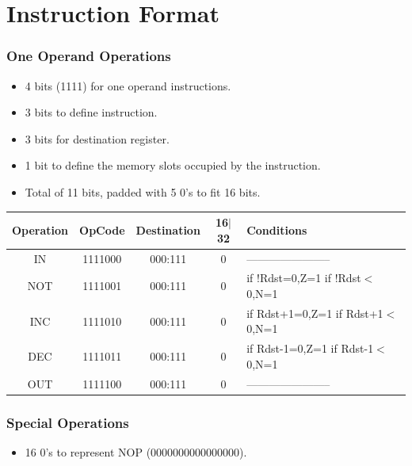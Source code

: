 \documentclass[12pt]{report}
\begin{document}
\part{Instruction Format}

\section{One Operand Operations}
\begin{itemize}
    \item 4 bits (1111) for one operand instructions.
    \item 3 bits to define instruction.
    \item 3 bits for destination register.
    \item 1 bit to define the memory slots occupied by the instruction.
    \item Total of 11 bits, padded with 5 0's to fit 16 bits.
\end{itemize}
\begin{center}
 \begin{tabular}{||c| c| c| c| p{40mm}||} 
 \hline
 Operation & OpCode & Destination & 16$|$32 & Conditions  \\ [0.5ex] 
 \hline\hline
 IN & 1111000 & 000:111 & 0 & ----------------------- \\
 \hline
 NOT & 1111001 & 000:111 & 0 & if !Rdst=0,Z=1 \newline if !Rdst$<$0,N=1 \\
 \hline
 INC & 1111010 & 000:111 & 0 & if Rdst+1=0,Z=1 \newline if Rdst+1$<$0,N=1 \\
 \hline
 DEC & 1111011 & 000:111 & 0 & if Rdst-1=0,Z=1 \newline if Rdst-1$<$0,N=1 \\
 \hline
 OUT & 1111100 & 000:111 & 0 & ----------------------- \\
 \hline
\end{tabular}
\end{center}

\section{Special Operations}
\begin{itemize}
    \item 16 0's to represent NOP (0000000000000000).
\end{itemize}
\end{document}
